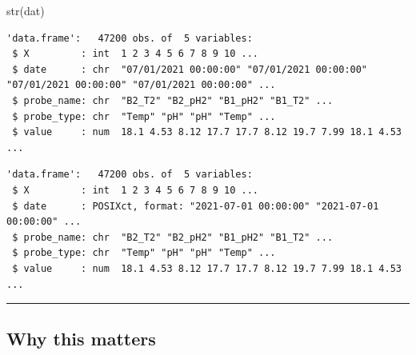 \documentclass[
  letterpaper,
  DIV=11,
  numbers=noendperiod]{scrartcl}
\newenvironment{Shaded}{\begin{snugshade}}{\end{snugshade}}
\newcommand{\CommentTok}[1]{\textcolor[rgb]{0.37,0.37,0.37}{#1}}
\newcommand{\FunctionTok}[1]{\textcolor[rgb]{0.28,0.35,0.67}{#1}}
\newcommand{\NormalTok}[1]{\textcolor[rgb]{0.00,0.23,0.31}{#1}}
\newcommand{\OtherTok}[1]{\textcolor[rgb]{0.00,0.23,0.31}{#1}}
\newcommand{\SpecialCharTok}[1]{\textcolor[rgb]{0.37,0.37,0.37}{#1}}
\begin{document}
\begin{Shaded}
\begin{Highlighting}[]
\FunctionTok{str}\NormalTok{(dat)}
\end{Highlighting}
\end{Shaded}

\begin{verbatim}
'data.frame':   47200 obs. of  5 variables:
 $ X         : int  1 2 3 4 5 6 7 8 9 10 ...
 $ date      : chr  "07/01/2021 00:00:00" "07/01/2021 00:00:00" "07/01/2021 00:00:00" "07/01/2021 00:00:00" ...
 $ probe_name: chr  "B2_T2" "B2_pH2" "B1_pH2" "B1_T2" ...
 $ probe_type: chr  "Temp" "pH" "pH" "Temp" ...
 $ value     : num  18.1 4.53 8.12 17.7 17.7 8.12 19.7 7.99 18.1 4.53 ...
\end{verbatim}

\begin{Shaded}
\end{Shaded}

\begin{verbatim}
'data.frame':   47200 obs. of  5 variables:
 $ X         : int  1 2 3 4 5 6 7 8 9 10 ...
 $ date      : POSIXct, format: "2021-07-01 00:00:00" "2021-07-01 00:00:00" ...
 $ probe_name: chr  "B2_T2" "B2_pH2" "B1_pH2" "B1_T2" ...
 $ probe_type: chr  "Temp" "pH" "pH" "Temp" ...
 $ value     : num  18.1 4.53 8.12 17.7 17.7 8.12 19.7 7.99 18.1 4.53 ...
\end{verbatim}

\begin{center}\rule{0.5\linewidth}{0.5pt}\end{center}

\hypertarget{why-this-matters}{%
\subsection{\texorpdfstring{\textbf{Why this
matters}}{Why this matters}}\label{why-this-matters}}
\end{document}
